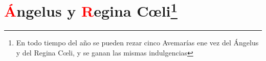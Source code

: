 \documentclass[10pt,twoside]{book}
\begin{document}
\begin{paracol}{2}
      \begin{leftcolumn*}
            
      \end{leftcolumn*}
      \begin{otherlanguage}{latin}
            \begin{rightcolumn}
                  
            \end{rightcolumn}
      \end{otherlanguage}
\end{paracol}


\chapter*{\centering \textcolor{red}{Á}ngelus y \textcolor{red}{R}egina C{\oe}li\footnote{En todo tiempo del año se pueden rezar cinco Avemarías ene vez del Ángelus y del Regina C{\oe}li,
y se ganan las mismas indulgencias\cite{ribera}}}
\end{document}

